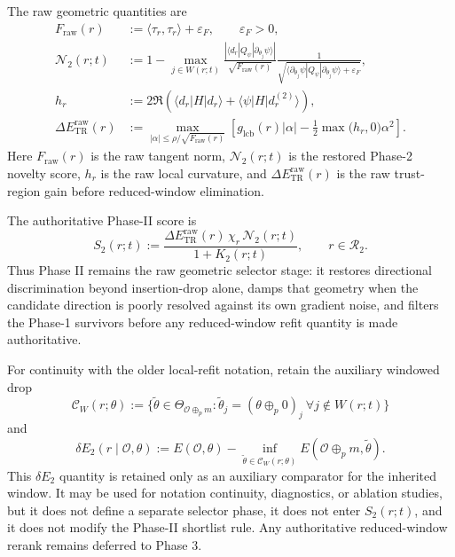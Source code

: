 \documentclass[11pt]{article}
\begin{document}
The raw geometric quantities are
\[
\begin{aligned}
F_{\mathrm{raw}}(r)&:=\langle \tau_r,\tau_r\rangle+\varepsilon_F,
\qquad \varepsilon_F>0,\\
\mathcal N_2(r;t)
&:=1-\max_{j\in W(r;t)}
\frac{\left|\langle d_r|Q_\psi|\partial_{\theta_j}\psi\rangle\right|}
{\sqrt{F_{\mathrm{raw}}(r)}}
\frac{1}{\sqrt{\langle \partial_{\theta_j}\psi|Q_\psi|\partial_{\theta_j}\psi\rangle+\varepsilon_F}},\\
h_r&:=2\Re\!\left(\langle d_r|H|d_r\rangle+\langle \psi|H|d_r^{(2)}\rangle\right),\\
\Delta E_{\mathrm{TR}}^{\mathrm{raw}}(r)
&:=\max_{|\alpha|\le \rho/\sqrt{F_{\mathrm{raw}}(r)}}
\left[g_{\mathrm{lcb}}(r)|\alpha|-\frac12\max\bigl(h_r,0\bigr)\alpha^2\right].
\end{aligned}
\]
Here \(F_{\mathrm{raw}}(r)\) is the raw tangent norm, \(\mathcal N_2(r;t)\) is the restored Phase-2 novelty score, \(h_r\) is the raw local curvature, and \(\Delta E_{\mathrm{TR}}^{\mathrm{raw}}(r)\) is the raw trust-region gain before reduced-window elimination.

The authoritative Phase-II score is
\[
S_2(r;t)
:=
\frac{\Delta E_{\mathrm{TR}}^{\mathrm{raw}}(r)\,\chi_r\,\mathcal N_2(r;t)}{1+K_2(r;t)},
\qquad r\in\mathcal R_2.
\]
Thus Phase II remains the raw geometric selector stage: it restores directional discrimination beyond insertion-drop alone, damps that geometry when the candidate direction is poorly resolved against its own gradient noise, and filters the Phase-1 survivors before any reduced-window refit quantity is made authoritative.

For continuity with the older local-refit notation, retain the auxiliary windowed drop
\[
\mathcal C_W(r;\theta):=\{\widetilde\theta\in\Theta_{\mathcal O\oplus_p m}:\widetilde\theta_j=(\theta\oplus_p 0)_j\ \forall j\notin W(r;t)\}
\]
and
\[
\delta E_2(r\mid\mathcal O,\theta):=
E(\mathcal O,\theta)-\inf_{\widetilde\theta\in\mathcal C_W(r;\theta)}E(\mathcal O\oplus_p m,\widetilde\theta).
\]
This \(\delta E_2\) quantity is retained only as an auxiliary comparator for the inherited window. It may be used for notation continuity, diagnostics, or ablation studies, but it does not define a separate selector phase, it does not enter \(S_2(r;t)\), and it does not modify the Phase-II shortlist rule. Any authoritative reduced-window rerank remains deferred to Phase 3.
\end{document}

